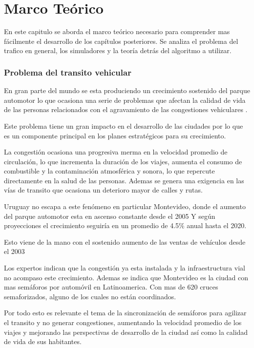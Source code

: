 \chapter{Marco Teórico}

 En este capitulo se aborda el marco teórico necesario para comprender mas fácilmente el desarrollo de los capítulos posteriores. Se analiza el problema del trafico en general, los simuladores y la teoría detrás del algoritmo a utilizar.

\subsection{Problema del transito vehicular}

En gran parte del mundo se esta produciendo un crecimiento sostenido del parque automotor lo que ocasiona una serie de problemas que afectan la calidad de vida de las personas relacionados con el agravamiento de las congestiones vehiculares \citep{Cepal2003}.

Este problema tiene un gran impacto en el desarrollo de las ciudades por lo que es un componente principal en los planes estratégicos para su crecimiento.

La congestión ocasiona una progresiva merma en la velocidad promedio de circulación, lo que incrementa la duración de los viajes, aumenta el consumo de combustible y la contaminación atmosférica y sonora, lo que repercute directamente en la salud de las personas. 
Ademas se genera una exigencia en las vías de transito que ocasiona un deterioro mayor de calles y rutas.

Uruguay no escapa a este fenómeno en particular Montevideo, donde el aumento del parque automotor esta en ascenso constante desde el 2005 \citep{INE2014} 
Y según proyecciones el crecimiento seguiría en un promedio de 4.5\% anual hasta el 2020. \citep{BBVA2013}

Esto viene de la mano con el sostenido aumento de las ventas de vehículos  desde el 2003 \citep{Autoanuario2014}

Los expertos indican que la congestión ya esta instalada y la infraestructura vial no acompaso este crecimiento. Ademas se indica que Montevideo es la ciudad con mas semáforos por automóvil en Latinoamerica. Con mas de 620 cruces semaforizados, alguno de los cuales no están coordinados.\citep{Subrayado2013}

Por todo esto es relevante el tema de la sincronización de semáforos para agilizar el transito y no generar congestiones, aumentando la velocidad promedio de los viajes y mejorando las perspectivas de desarrollo de la ciudad así como la calidad de vida de sus habitantes.

